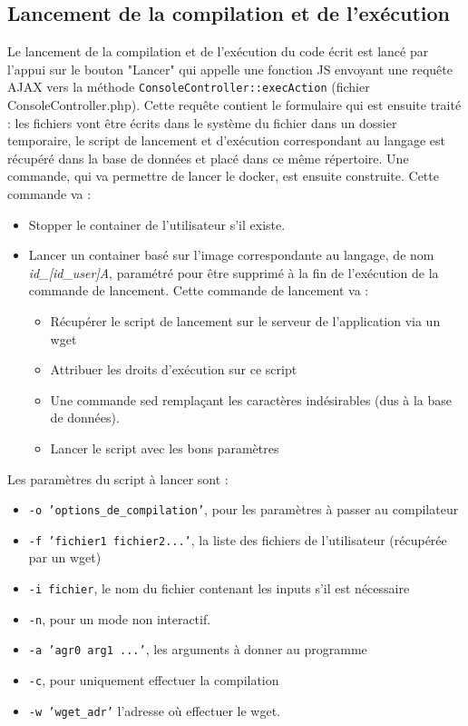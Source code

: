 \subsection{Lancement de la compilation et de l'exécution}

Le lancement de la compilation et de l'exécution du code écrit est lancé par l'appui sur le bouton "Lancer" qui appelle une fonction JS envoyant une requête AJAX vers la méthode \texttt{ConsoleController::execAction} (fichier ConsoleController.php). Cette requête contient le formulaire qui est ensuite traité : les fichiers vont être écrits dans le système du fichier dans un dossier temporaire, le script de lancement et d'exécution correspondant au langage est récupéré dans la base de données et placé dans ce même répertoire. Une commande, qui va permettre de lancer le docker, est ensuite construite. Cette commande va :
\begin{itemize}
  \item Stopper le container de l'utilisateur s'il existe.
  \item{Lancer un container basé sur l'image correspondante au langage, de nom \emph{id\_[id\_user]A}, paramétré pour être supprimé à la fin de l'exécution de la commande de lancement. Cette commande de lancement va :
  \begin{itemize}
    \item Récupérer le script de lancement sur le serveur de l'application via un wget
    \item Attribuer les droits d'exécution sur ce script
    \item Une commande sed remplaçant les caractères indésirables (dus à la base de données).
    \item Lancer le script avec les bons paramètres
  \end{itemize}}
\end{itemize}

Les paramètres du script à lancer sont :
\begin{itemize}
  \item \texttt{-o 'options\_de\_compilation'}, pour les paramètres à passer au compilateur
  \item \texttt{-f 'fichier1 fichier2...'}, la liste des fichiers de l'utilisateur (récupérée par un wget)
  \item \texttt{-i fichier}, le nom du fichier contenant les inputs s'il est nécessaire
  \item \texttt{-n}, pour un mode non interactif.
  \item \texttt{-a 'agr0 arg1 ...'}, les arguments à donner au programme
  \item \texttt{-c}, pour uniquement effectuer la compilation
  \item \texttt{-w 'wget\_adr'} l'adresse où effectuer le wget.
\end{itemize}

